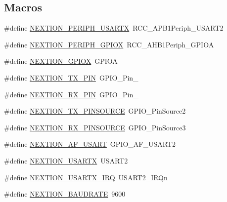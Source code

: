 \subsection*{Macros}
\begin{DoxyCompactItemize}
\item 
\#define \hyperlink{group__nextion___constants_ga523f9520cea00f41b66c2b01fc0865e6}{N\+E\+X\+T\+I\+O\+N\+\_\+\+P\+E\+R\+I\+P\+H\+\_\+\+U\+S\+A\+R\+TX}~R\+C\+C\+\_\+\+A\+P\+B1\+Periph\+\_\+\+U\+S\+A\+R\+T2
\item 
\#define \hyperlink{group__nextion___constants_ga0196543a58aaa665478912e81c89d98a}{N\+E\+X\+T\+I\+O\+N\+\_\+\+P\+E\+R\+I\+P\+H\+\_\+\+G\+P\+I\+OX}~R\+C\+C\+\_\+\+A\+H\+B1\+Periph\+\_\+\+G\+P\+I\+OA
\item 
\#define \hyperlink{group__nextion___constants_gab6c406ec72b8a3e97f1808c45b638af0}{N\+E\+X\+T\+I\+O\+N\+\_\+\+G\+P\+I\+OX}~G\+P\+I\+OA
\item 
\#define \hyperlink{group__nextion___constants_gaa79fddaf825d5ea9b2da1c513cf7f33c}{N\+E\+X\+T\+I\+O\+N\+\_\+\+T\+X\+\_\+\+P\+IN}~G\+P\+I\+O\+\_\+\+Pin\+\_
\item 
\#define \hyperlink{group__nextion___constants_ga0b9b07a73114a9307ebbeb77b8c47197}{N\+E\+X\+T\+I\+O\+N\+\_\+\+R\+X\+\_\+\+P\+IN}~G\+P\+I\+O\+\_\+\+Pin\+\_
\item 
\#define \hyperlink{group__nextion___constants_gafefb806155aed3ab1f0d24fb6354013d}{N\+E\+X\+T\+I\+O\+N\+\_\+\+T\+X\+\_\+\+P\+I\+N\+S\+O\+U\+R\+CE}~G\+P\+I\+O\+\_\+\+Pin\+Source2
\item 
\#define \hyperlink{group__nextion___constants_gaf726552562001a24196beeebbda67b0e}{N\+E\+X\+T\+I\+O\+N\+\_\+\+R\+X\+\_\+\+P\+I\+N\+S\+O\+U\+R\+CE}~G\+P\+I\+O\+\_\+\+Pin\+Source3
\item 
\#define \hyperlink{group__nextion___constants_ga7ed41bc717c1e697ef0d66f1a385c3e9}{N\+E\+X\+T\+I\+O\+N\+\_\+\+A\+F\+\_\+\+U\+S\+A\+RT}~G\+P\+I\+O\+\_\+\+A\+F\+\_\+\+U\+S\+A\+R\+T2
\item 
\#define \hyperlink{group__nextion___constants_gad110200ed1c63345918573270b4666ee}{N\+E\+X\+T\+I\+O\+N\+\_\+\+U\+S\+A\+R\+TX}~U\+S\+A\+R\+T2
\item 
\#define \hyperlink{group__nextion___constants_ga781191cedaf0e3bbbe8e3a37d54a7d2c}{N\+E\+X\+T\+I\+O\+N\+\_\+\+U\+S\+A\+R\+T\+X\+\_\+\+I\+RQ}~U\+S\+A\+R\+T2\+\_\+\+I\+R\+Qn
\item 
\#define \hyperlink{group__nextion___constants_gaf4e8e457f0055ebab4c1bf8a04d6473e}{N\+E\+X\+T\+I\+O\+N\+\_\+\+B\+A\+U\+D\+R\+A\+TE}~9600
\end{DoxyCompactItemize}


